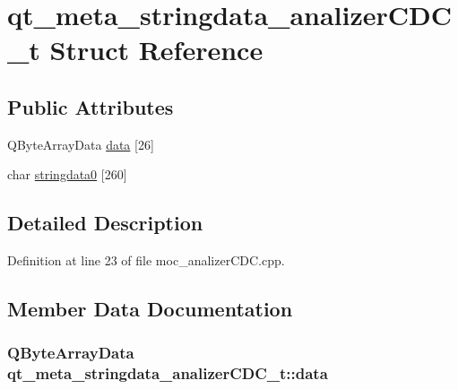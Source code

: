 \hypertarget{structqt__meta__stringdata__analizer_c_d_c__t}{\section{qt\+\_\+meta\+\_\+stringdata\+\_\+analizer\+C\+D\+C\+\_\+t Struct Reference}
\label{structqt__meta__stringdata__analizer_c_d_c__t}
}
\subsection*{Public Attributes}
\begin{DoxyCompactItemize}
\item 
Q\+Byte\+Array\+Data \hyperlink{structqt__meta__stringdata__analizer_c_d_c__t_ad190fafa230891c65f0e1e07ce1a6c7b}{data} \mbox{[}26\mbox{]}
\item 
char \hyperlink{structqt__meta__stringdata__analizer_c_d_c__t_a6c9dec6a6c7ed93e847c04d01fca28d0}{stringdata0} \mbox{[}260\mbox{]}
\end{DoxyCompactItemize}


\subsection{Detailed Description}


Definition at line 23 of file moc\+\_\+analizer\+C\+D\+C.\+cpp.



\subsection{Member Data Documentation}
\hypertarget{structqt__meta__stringdata__analizer_c_d_c__t_ad190fafa230891c65f0e1e07ce1a6c7b}{
\subsubsection[{data}]{\setlength{\rightskip}{0pt plus 5cm}Q\+Byte\+Array\+Data qt\+\_\+meta\+\_\+stringdata\+\_\+analizer\+C\+D\+C\+\_\+t\+::data}}\label{structqt__meta__stringdata__analizer_c_d_c__t_ad190fafa230891c65f0e1e07ce1a6c7b}


